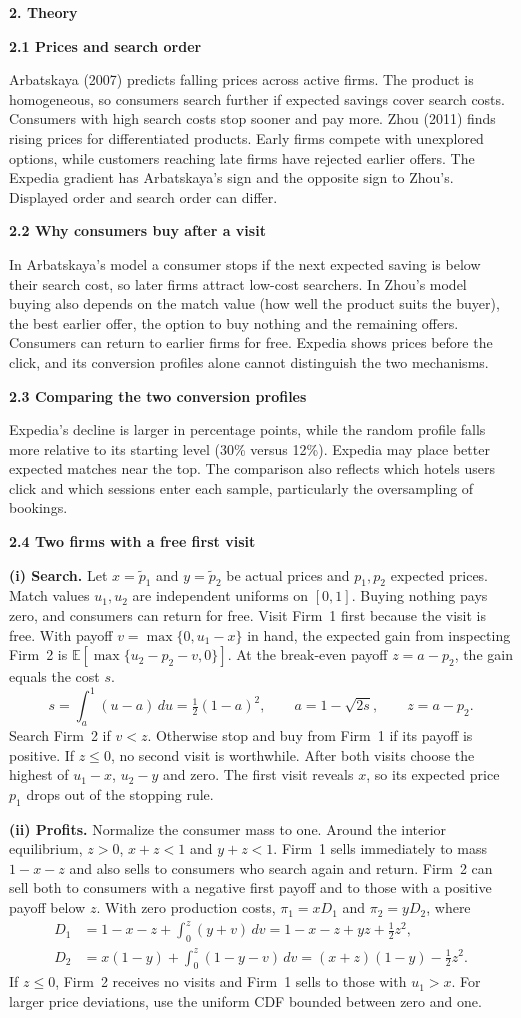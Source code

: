 \documentclass[a4paper,12pt]{article}
\newcommand{\subhead}[1]{\par\smallskip\noindent\textbf{#1}\par\nobreak\smallskip}
\newcommand{\mainhead}[1]{\par\medskip\noindent\textbf{#1}\par\nobreak\smallskip}
\begin{document}
\mainhead{2. Theory}
\subhead{2.1 Prices and search order}
Arbatskaya (2007) predicts falling prices across active firms. The product is homogeneous, so consumers search further if expected savings cover search costs. Consumers with high search costs stop sooner and pay more. Zhou (2011) finds rising prices for differentiated products. Early firms compete with unexplored options, while customers reaching late firms have rejected earlier offers. The Expedia gradient has Arbatskaya's sign and the opposite sign to Zhou's. Displayed order and search order can differ.

\subhead{2.2 Why consumers buy after a visit}
In Arbatskaya's model a consumer stops if the next expected saving is below their search cost, so later firms attract low-cost searchers. In Zhou's model buying also depends on the match value (how well the product suits the buyer), the best earlier offer, the option to buy nothing and the remaining offers. Consumers can return to earlier firms for free. Expedia shows prices before the click, and its conversion profiles alone cannot distinguish the two mechanisms.

\newpage
\subhead{2.3 Comparing the two conversion profiles}
Expedia's decline is larger in percentage points, while the random profile falls more relative to its starting level (30\% versus 12\%). Expedia may place better expected matches near the top. The comparison also reflects which hotels users click and which sessions enter each sample, particularly the oversampling of bookings.

\subhead{2.4 Two firms with a free first visit}
\textbf{(i) Search.} Let $x=\tilde p_1$ and $y=\tilde p_2$ be actual prices and $p_1,p_2$ expected prices. Match values $u_1,u_2$ are independent uniforms on $[0,1]$. Buying nothing pays zero, and consumers can return for free. Visit Firm~1 first because the visit is free. With payoff $v=\max\{0,u_1-x\}$ in hand, the expected gain from inspecting Firm~2 is $\mathbb{E}[\max\{u_2-p_2-v,0\}]$. At the break-even payoff $z=a-p_2$, the gain equals the cost $s$.
\[
s=\int_a^1 (u-a)\,du=\tfrac12(1-a)^2,\qquad
a=1-\sqrt{2s},\qquad z=a-p_2.
\]
Search Firm~2 if $v<z$. Otherwise stop and buy from Firm~1 if its payoff is positive. If $z\leq0$, no second visit is worthwhile. After both visits choose the highest of $u_1-x$, $u_2-y$ and zero. The first visit reveals $x$, so its expected price $p_1$ drops out of the stopping rule.

\textbf{(ii) Profits.} Normalize the consumer mass to one. Around the interior equilibrium, $z>0$, $x+z<1$ and $y+z<1$. Firm~1 sells immediately to mass $1-x-z$ and also sells to consumers who search again and return. Firm~2 can sell both to consumers with a negative first payoff and to those with a positive payoff below $z$. With zero production costs, $\pi_1=xD_1$ and $\pi_2=yD_2$, where
\begin{align*}
D_1 &= 1-x-z+\int_0^z(y+v)\,dv = 1-x-z+yz+\tfrac12 z^2,\\
D_2 &= x(1-y)+\int_0^z(1-y-v)\,dv = (x+z)(1-y)-\tfrac12 z^2.
\end{align*}
If $z\leq0$, Firm~2 receives no visits and Firm~1 sells to those with $u_1>x$. For larger price deviations, use the uniform CDF bounded between zero and one.
\end{document}
